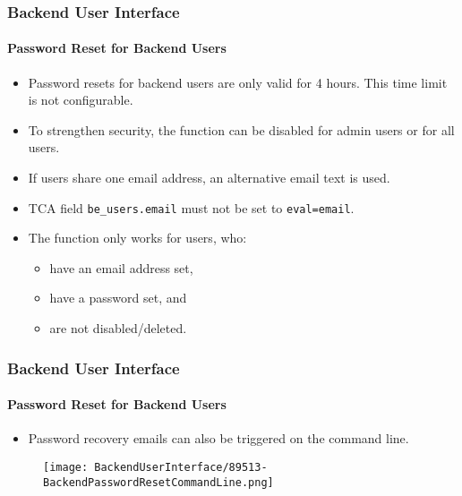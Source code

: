 
\begin{frame}[fragile]
	\frametitle{Backend User Interface}
	\framesubtitle{Password Reset for Backend Users}

	\begin{itemize}

		\item Password resets for backend users are only valid for 4 hours.\newline
			This time limit is not configurable.
		\item To strengthen security, the function can be disabled for admin users or for all users.
		\item If users share one email address, an alternative email text is used.
		\item TCA field \texttt{be\_users.email} must not be set to \texttt{eval=email}.

		\item The function only works for users, who:
			\begin{itemize}
				\item have an email address set,
				\item have a password set, and
				\item are not disabled/deleted.
			\end{itemize}

	\end{itemize}

\end{frame}


\begin{frame}[fragile]
	\frametitle{Backend User Interface}
	\framesubtitle{Password Reset for Backend Users}

	\begin{itemize}
		\item Password recovery emails can also be triggered on the command line.
	\end{itemize}

	\begin{figure}
		\texttt{[image: BackendUserInterface/89513-BackendPasswordResetCommandLine.png]}
	\end{figure}

\end{frame}

